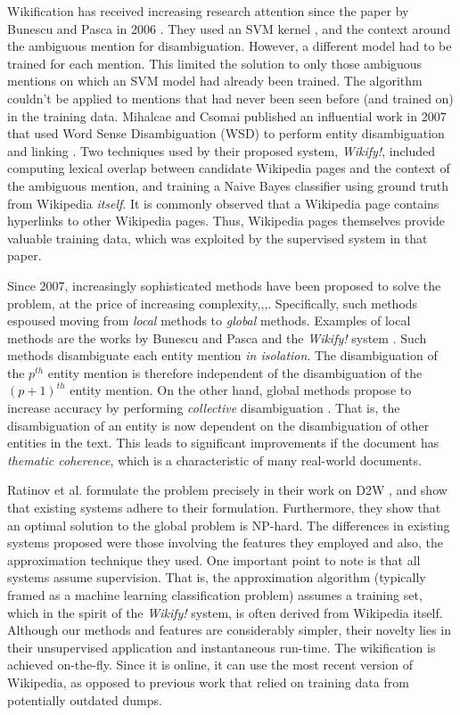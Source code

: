 Wikification has received increasing research attention since the paper by Bunescu and Pasca in 2006 \cite{bunescu}. They used an SVM kernel \cite{svm}, and the context around the ambiguous mention for disambiguation. However, a different model had to be trained for each mention. This limited the solution to only those ambiguous mentions on which an SVM model had already been trained. The algorithm couldn't be applied to mentions that had never been seen before (and trained on) in the training data. Mihalcae and Csomai published an influential work in 2007 that used Word Sense Disambiguation (WSD) \cite{wsd} to perform entity disambiguation and linking \cite{wikify}. Two techniques used by their proposed system, \emph{Wikify!}, included computing lexical overlap between candidate Wikipedia pages and the context of the ambiguous mention, and training a Naive Bayes classifier using ground truth from Wikipedia \emph{itself}. It is commonly observed that a Wikipedia page contains hyperlinks to other Wikipedia pages. Thus, Wikipedia pages themselves provide valuable training data, which was exploited by the supervised system in that paper.

Since 2007, increasingly sophisticated methods have been proposed to solve the problem, at the price of increasing complexity\cite{milne},\cite{cucerzan},\cite{roth},\cite{global1}. Specifically, such methods espoused moving from \emph{local} methods to \emph{global} methods. Examples of local methods are the works by Bunescu and Pasca \cite{bunescu} and the \emph{Wikify!} system \cite{wikify}. Such methods disambiguate each entity mention \emph{in isolation}. The disambiguation of the $p^{th}$ entity mention is therefore independent of the disambiguation of the $(p+1)^{th}$ entity mention. On the other hand, global methods propose to increase accuracy by performing \emph{collective} disambiguation \cite{global1}. That is, the disambiguation of an entity is now dependent on the disambiguation of other entities in the text. This leads to significant improvements if the document has \emph{thematic coherence}, which is a characteristic of many real-world documents.

Ratinov et al. formulate the problem precisely in their work on D2W \cite{roth}, and show that existing systems adhere to their formulation. Furthermore, they show that an optimal solution to the global problem is NP-hard. The differences in existing systems proposed were those involving the features they employed and also, the approximation technique they used. One important point to note is that all systems assume supervision. That is, the approximation algorithm (typically framed as a machine learning classification problem) assumes a training set, which in the spirit of the \emph{Wikify!} system, is often derived from Wikipedia itself. Although our methods and features are considerably simpler, their novelty lies in their unsupervised application and instantaneous run-time. The wikification is achieved on-the-fly. Since it is online, it can use the most recent version of Wikipedia, as opposed to previous work that relied on training data from potentially outdated dumps.   

